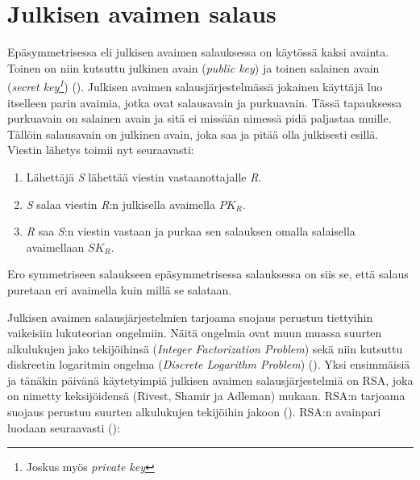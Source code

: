  \section{Julkisen avaimen salaus}
 Epäsymmetrisessa eli julkisen avaimen salauksessa on käytössä kaksi avainta. Toinen on niin kutsuttu julkinen avain (\emph{public key}) ja toinen salainen avain (\emph{secret key\footnote{Joskus myös \emph{private key}}}) (\cite{bellare2005introduction}). Julkisen avaimen salausjärjestelmässä jokainen käyttäjä luo itselleen parin avaimia, jotka ovat salausavain ja purkuavain. Tässä tapauksessa purkuavain on salainen avain ja sitä ei missään nimessä pidä paljastaa muille. Tällöin salausavain on julkinen avain, joka saa ja pitää olla julkisesti esillä. Viestin lähetys toimii nyt seuraavasti:
 
 \begin{enumerate}
     \item Lähettäjä \emph{S} lähettää viestin vastaanottajalle \emph{R}.
     \item \emph{S} salaa viestin \emph{R}:n julkisella avaimella $PK_{R}$.
     \item \emph{R} saa \emph{S}:n viestin vastaan ja purkaa sen salauksen omalla salaisella avaimellaan $SK_{R}$.
 \end{enumerate}
Ero symmetriseen salaukseen epäsymmetrisessa salauksessa on siis se, että salaus puretaan eri avaimella kuin millä se salataan.
 
  Julkisen avaimen salausjärjestelmien tarjoama suojaus perustuu tiettyihin vaikeisiin lukuteorian ongelmiin. Näitä ongelmia ovat muun muassa suurten alkulukujen jako tekijöihinsä (\emph{Integer Factorization Problem}) sekä niin kutsuttu diskreetin logaritmin ongelma (\emph{Discrete Logarithm Problem}) (\cite{10.1007/978-3-319-11659-4_15}).
  Yksi ensimmäisiä ja tänäkin päivänä käytetyimpiä julkisen avaimen salausjärjestelmiä on RSA, joka on nimetty keksijöidensä (Rivest, Shamir ja Adleman) mukaan. RSA:n tarjoama suojaus perustuu suurten alkulukujen tekijöihin jakoon (\cite{montgomery1994survey}). RSA:n avainpari luodaan seuraavasti  (\cite{doi:10.1080/23742917.2016.1226650}):
  
